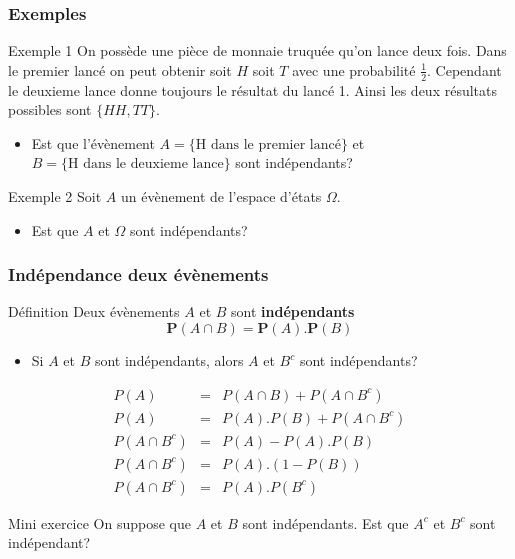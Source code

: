 \documentclass{beamer}
\begin{document}
\begin{frame}[t]
  \frametitle{Exemples}
 \begin{block}{Exemple 1}
  \scriptsize 
On possède une pièce de monnaie truquée qu'on lance deux fois. Dans le premier
lancé on peut obtenir soit $H$ soit $T$ avec une probabilité $\frac{1}{2}$.
Cependant le deuxieme lance donne toujours le résultat du lancé 1. Ainsi les
deux résultats possibles sont $\{HH, TT\}$.
\begin{itemize}
  \item Est que l'évènement $A=\{\text{H dans le premier lancé}\}$ et
    $B=\{\text{H dans le deuxieme lance}\}$ sont indépendants?
\end{itemize}
 \end{block} 

 \pause
 \begin{block}{Exemple 2}
   \scriptsize
   Soit $A$ un évènement de l'espace d'états $\Omega$.\\[4pt]
  \begin{itemize}
    \item Est que $A$ et $\Omega$ sont indépendants? \end{itemize}
 \end{block}
\end{frame}

\begin{frame}[t]
  \frametitle{Indépendance deux évènements}
  \small
          \begin{block}{Définition}
            \scriptsize
            Deux évènements $A$ et $B$ sont \alert{\textbf{indépendants}} 
            $$
            \mathbf{P}(A\cap B) = \mathbf{P}(A).\mathbf{P}(B)
            $$
          \end{block}

          \begin{itemize}
            \item Si $A$ et $B$ sont indépendants, alors $A$ et $B^c$ sont
              indépendants?
          \end{itemize}
          \pause
          \begin{eqnarray*}
            P(A) &=& P(A\cap B) + P(A \cap B^c)\\
            P(A)  &=& P(A).P(B)   + P(A \cap B^c)\\
            P(A\cap B^c) &=& P(A) - P(A).P(B)\\
            P(A\cap B^c) &=& P(A).(1 - P(B))\\
            P(A\cap B^c) &=& P(A).P(B^c)
          \end{eqnarray*}

          \pause
          \begin{block}{Mini exercice}
            \scriptsize
            On suppose que $A$ et $B$ sont indépendants. Est que $A^c$ et $B^c$ sont
            indépendant?
            
          \end{block}
  
\end{frame}
\end{document}
